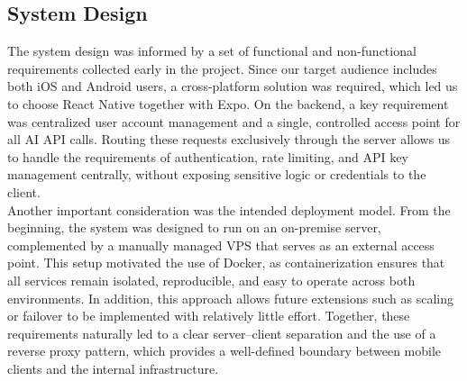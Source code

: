 \documentclass[11pt,a4paper]{article}
\begin{document}
\FloatBarrier
\subsection{System Design}
\label{chap:sys}
The system design was informed by a set of functional and non-functional requirements collected early in the project. Since our target audience includes both iOS and Android users, a cross-platform solution was required, which led us to choose React Native together with Expo. On the backend, a key requirement was centralized user account management and a single, controlled access point for all AI API calls. Routing these requests exclusively through the server allows us to handle the requirements of authentication, rate limiting, and API key management centrally, without exposing sensitive logic or credentials to the client.
\\
Another important consideration was the intended deployment model. From the beginning, the system was designed to run on an on-premise server, complemented by a manually managed VPS that serves as an external access point. This setup motivated the use of Docker, as containerization ensures that all services remain isolated, reproducible, and easy to operate across both environments. In addition, this approach allows future extensions such as scaling or failover to be implemented with relatively little effort. Together, these requirements naturally led to a clear server--client separation and the use of a reverse proxy pattern, which provides a well-defined boundary between mobile clients and the internal infrastructure.
 
\end{document}
